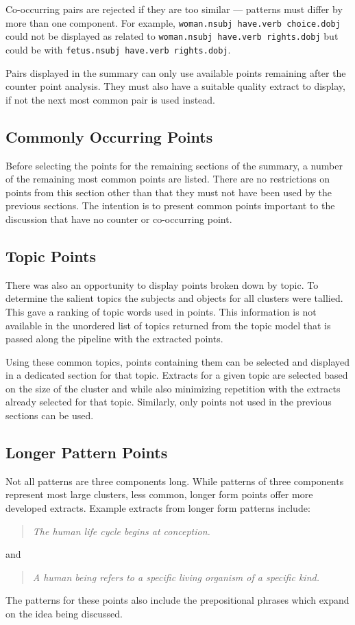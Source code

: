       Co-occurring pairs are rejected if they are too similar --- patterns must differ by more than one component. For example, \texttt{woman.nsubj have.verb choice.dobj} could not be displayed as related to \texttt{woman.nsubj have.verb rights.dobj} but could be with \texttt{fetus.nsubj have.verb rights.dobj}.

      Pairs displayed in the summary can only use available points remaining after the counter point analysis. They must also have a suitable quality extract to display, if not the next most common pair is used instead.
    \subsection{Commonly Occurring Points}
      Before selecting the points for the remaining sections of the summary, a number of the remaining most common points are listed. There are no restrictions on points from this section other than that they must not have been used by the previous sections. The intention is to present common points important to the discussion that have no counter or co-occurring point.

    \subsection{Topic Points}
      There was also an opportunity to display points broken down by topic. To determine the salient topics the subjects and objects for all clusters were tallied. This gave a ranking of topic words used in points. This information is not available in the unordered list of topics returned from the topic model that is passed along the pipeline with the extracted points.

      Using these common topics, points containing them can be selected and displayed in a dedicated section for that topic. Extracts for a given topic are selected based on the size of the cluster and while also minimizing repetition with the extracts already selected for that topic. Similarly, only points not used in the previous sections can be used.

    \subsection{Longer Pattern Points}
    Not all patterns are three components long. While patterns of three components represent most large clusters, less common, longer form points offer more developed extracts. Example extracts from longer form patterns include: \blockquote{\textit{The human life cycle begins at conception.}} and \blockquote{\textit{A human being refers to a specific living organism of a specific kind.}}. The patterns for these points also include the prepositional phrases which expand on the idea being discussed.

